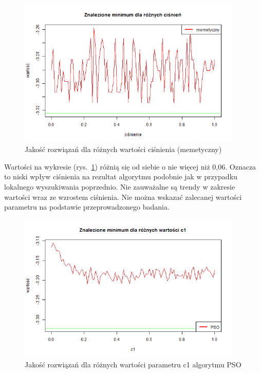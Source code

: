 \documentclass[11pt, a4paper]{article}
\newcommand{\fbi}{\leavevmode{\parindent=1em\indent}}
\begin{document}
\begin{figure}[H]
	\centering
	\includegraphics[width=0.95\textwidth]{./assets/Hartman6pressel.png}
	\caption{Jakość rozwiązań dla różnych wartości ciśnienia (memetyczny)}
	\label{fig:hybridpressel}
\end{figure}

\fbi
Wartości na wykresie (rys.~\ref{fig:hybridpressel}) różnią się od siebie o nie więcej niż 0,06. Oznacza to niski wpływ ciśnienia na rezultat algorytmu podobnie jak w przypadku lokalnego wyszukiwania poprzednio. Nie zauważalne są trendy w zakresie wartości wraz ze wzrostem ciśnienia. Nie można wskazać zalecanej wartości parametru na podstawie przeprowadzonego badania.

\begin{figure}[H]
	\centering
	\includegraphics[width=0.95\textwidth]{./assets/Hartman6c1.png}
	\caption{Jakość rozwiązań dla różnych wartości parametru c1 algorytmu PSO}
	\label{fig:psoc1}
\end{figure}
\end{document}
